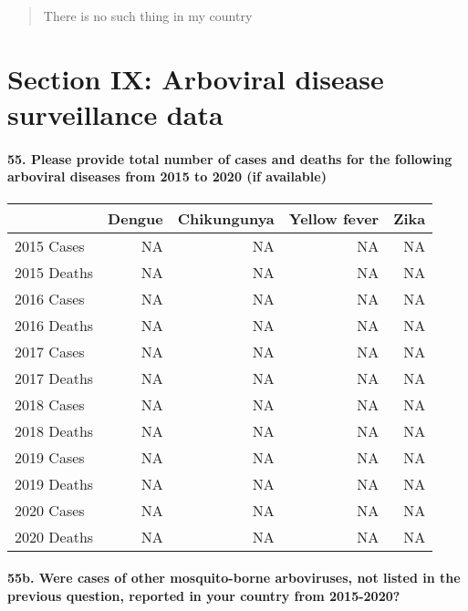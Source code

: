 \documentclass[
]{article}
\begin{document}
\begin{quote}
There is no such thing in my country
\end{quote}

\hypertarget{section-ix-arboviral-disease-surveillance-data}{%
\section{Section IX: Arboviral disease surveillance
data}\label{section-ix-arboviral-disease-surveillance-data}}

\hypertarget{please-provide-total-number-of-cases-and-deaths-for-the-following-arboviral-diseases-from-2015-to-2020-if-available}{%
\paragraph{55. Please provide total number of cases and deaths for the
following arboviral diseases from 2015 to 2020 (if
available)}\label{please-provide-total-number-of-cases-and-deaths-for-the-following-arboviral-diseases-from-2015-to-2020-if-available}}

\begin{longtable}[]{@{}lrrrr@{}}
\toprule
& Dengue & Chikungunya & Yellow fever & Zika \\
\midrule
\endhead
2015 Cases & NA & NA & NA & NA \\
2015 Deaths & NA & NA & NA & NA \\
2016 Cases & NA & NA & NA & NA \\
2016 Deaths & NA & NA & NA & NA \\
2017 Cases & NA & NA & NA & NA \\
2017 Deaths & NA & NA & NA & NA \\
2018 Cases & NA & NA & NA & NA \\
2018 Deaths & NA & NA & NA & NA \\
2019 Cases & NA & NA & NA & NA \\
2019 Deaths & NA & NA & NA & NA \\
2020 Cases & NA & NA & NA & NA \\
2020 Deaths & NA & NA & NA & NA \\
\bottomrule
\end{longtable}

\hypertarget{b.-were-cases-of-other-mosquito-borne-arboviruses-not-listed-in-the-previous-question-reported-in-your-country-from-2015-2020}{%
\paragraph{55b. Were cases of other mosquito-borne arboviruses, not
listed in the previous question, reported in your country from
2015-2020?}\label{b.-were-cases-of-other-mosquito-borne-arboviruses-not-listed-in-the-previous-question-reported-in-your-country-from-2015-2020}}
\end{document}
